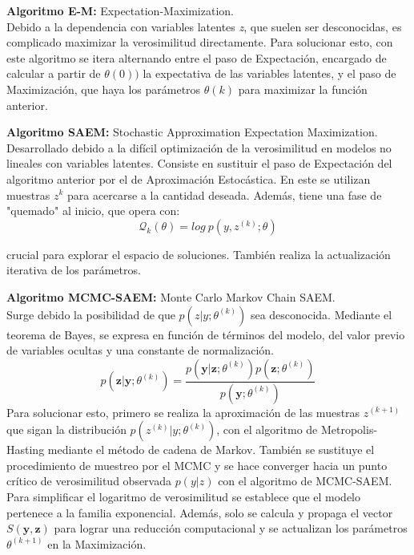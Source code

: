 	\begin{description}
		\item {\textbf{Algoritmo E-M: }}Expectation-Maximization.\\
		Debido a la dependencia con variables latentes \textit{z}, que suelen ser desconocidas, es complicado maximizar la verosimilitud directamente. Para solucionar esto, con este algoritmo se itera alternando entre el paso de Expectación, encargado de calcular a partir de $\theta(0))$  la expectativa de las variables latentes, y el paso de Maximización, que haya los parámetros $\theta(k)$ para maximizar la función anterior.
		
		\item {\textbf{Algoritmo SAEM: }}Stochastic Approximation Expectation Maximization.\\
		Desarrollado debido a la difícil optimización de la verosimilitud en modelos no lineales con variables latentes. Consiste en sustituir el paso de Expectación del algoritmo anterior por el de Aproximación Estocástica. En este se utilizan muestras $z^{k}$ para acercarse a la cantidad deseada. Además, tiene una fase de "quemado" al inicio, que opera con:
		\begin{equation}
			\mathcal{Q}_{k}(\theta)=log\ p(y,z^{(k)};\theta)
		\end{equation}
		
		crucial para explorar el espacio de soluciones. También realiza la actualización iterativa de los parámetros.
		
		\item {\textbf{Algoritmo MCMC-SAEM: }}Monte Carlo Markov Chain SAEM.\\
		Surge debido la posibilidad de que $p(z|y;\theta^{(k)})$ sea desconocida. Mediante el teorema de Bayes, se expresa en función de términos del modelo, del valor previo de variables ocultas y una constante de normalización.
		\begin{equation}
			p(\mathbf{z}|\mathbf{y};\theta^{(k)})=\frac{p(\mathbf{y}|\mathbf{z};\theta^{(k)})p(\mathbf{z};\theta^{(k)})}{p(\mathbf{y};\theta^{(k)})}
		\end{equation}
		Para solucionar esto, primero se realiza la aproximación de las muestras $z^{(k+1)}$  que sigan la distribución $p(z^{(k)}|y;\theta^{(k)})$, con el algoritmo de Metropolis-Hasting mediante el método de cadena de Markov. También se sustituye el procedimiento de muestreo por el MCMC y se hace converger hacia un punto crítico de verosimilitud observada $p(y|z)$ con el algoritmo de MCMC-SAEM. Para simplificar el logaritmo de verosimilitud se establece que el modelo pertenece a la familia exponencial. Además, solo se calcula y propaga el vector $\mathit{S}(\mathbf{y},\mathbf{z})$ para lograr una reducción computacional y se actualizan los parámetros $\theta^{(k+1)}$ en la Maximización. \cite[Capítulo 2]{koval2020learning}
		

\end{description}

